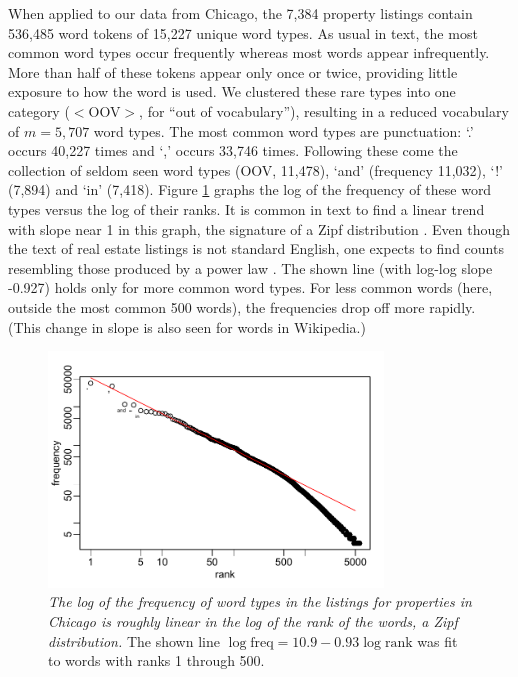 \documentclass[10pt]{article}
\begin{document}
  
 When applied to our data from Chicago, the 7,384 property listings contain
 536,485 word tokens of 15,227 unique word types.  As usual in text, the most
 common word types occur frequently whereas most words appear infrequently.
  More than half of these tokens appear only once or twice, providing little
 exposure to how the word is used.  We clustered these rare types into one
 category ($<$OOV$>$, for ``out of vocabulary''), resulting in a reduced
 vocabulary of $m = 5,707$ word types.  The most common word types are
 punctuation: `.'  occurs 40,227 times and `,' occurs 33,746 times.  Following
 these come the collection of seldom seen word types (OOV, 11,478), `and'
 (frequency 11,032), `!' (7,894) and `in' (7,418).  Figure \ref{fig:zipf} graphs
 the log of the frequency of these word types versus the log of their ranks.  It
 is common in text to find a linear trend with slope near 1 in this graph, the
 signature of a Zipf distribution \citep{zipf35, baayen02}.  Even though the
 text of real estate listings is not standard English, one expects to find
 counts resembling those produced by a power law \citep{clauset09}.  The shown
 line (with log-log slope -0.927) holds only for more common word types.  For
 less common words (here, outside the most common 500 words), the frequencies
 drop off more rapidly.  (This change in slope is also seen for words in
 Wikipedia.)


 \begin{figure}
 \caption{ \label{fig:zipf} { \sl The log of the frequency of word types in the
 listings for properties in Chicago is roughly linear in the log of the rank of
 the words, a Zipf distribution.}  The shown line $\log \mbox{freq} = 10.9 -
 0.93 \log \mbox{rank}$ was fit to words with ranks 1 through 500.  }

 \centerline{
 \vspace{0.1in}
 \includegraphics[width=3.5in]{figures/zipf} }
 \vspace{0.2in}
 \end{figure}
\end{document}
